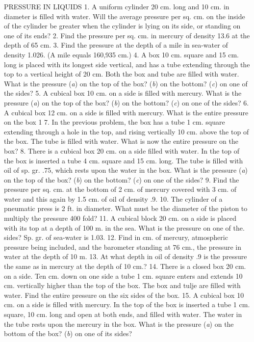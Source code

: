 PRESSURE IN LIQUIDS
1. A uniform cylinder 20 cm. long and 10 cm. in diameter is filled with water. Will the average pressure per sq. cm. on the inside of the cylinder be greater when the cylinder is lying on its side, or standing on one of its ends?
2. Find the pressure per sq. cm. in mercury of density 13.6 at the depth of 65 cm.
3. Find the pressure at the depth of a mile in sea-water of density 1.026. (A mile equals 160,935 cm.)
4. A box 10 cm. square and 15 cm. long is placed with its longest side vertical, and has a tube extending through the top to a vertical height of 20 cm. Both the box and tube are filled with water. What is the pressure (\emph{a}) on the top of the box? (\emph{b}) on the bottom? (\emph{c}) on one of the sides?
5. A cubical box 10 cm. on a side is filled with mercury. What is the pressure (\emph{a}) on the top of the box? (\emph{b}) on the bottom? (\emph{c}) on one of the sides?
6. A cubical box 12 cm. on a side is filled with mercury. What is the entire pressure on the box 1
7. In the previous problem, the box has a tube 1 cm. square extending through a hole in the top, and rising vertically 10 cm. above the top of the box. The tube is filled with water. What is now the entire pressure on the box?
8. There is a cubical box 20 cm. on a side filled with water. In the top of the box is inserted a tube 4 cm. square and 15 cm. long. The tube is filled with oil of sp. gr. .75, which rests upon the water in the box. What is the pressure (\emph{a}) on the top of the box? (\emph{b}) on the bottom? (\emph{c}) on one of the sides?
9. Find the pressure per sq. cm. at the bottom of 2 cm. of mercury covered with 3 cm. of water and this again by 1.5 cm. of oil of density .9.
10. The cylinder of a pneumatic press is 2 ft. in diameter. What must be the diameter of the piston to multiply the pressure 400 fold?
11. A cubical block 20 cm. on a side is placed with its top at a depth of 100 m. in the sea. What is the pressure on one of the. sides? Sp. gr. of sea-water is 1.03.
12. Find in cm. of mercury, atmospheric pressure being included, and the barometer standing at 76 cm., the pressure in water at the depth of 10 m.
13. At what depth in oil of density .9 is the pressure the same as in mercury at the depth of 10 cm.?
14. There is a closed box 20 cm. on a side. Ten cm. down on one side a tube 1 cm. square enters and extends 10 cm. vertically higher than the top of the box. The box and tulje are filled with water. Find the entire pressure on the six sides of the box.
15. A cubical box 10 cm. on a side is filled with mercury. In the top of the box is inserted a tube 1 cm. square, 10 cm. long and open at both ends, and filled with water. The water in the tube rests upon the mercury in the box. What is the pressure (\emph{a}) on the bottom of the box? (\emph{b}) on one of its sides?
